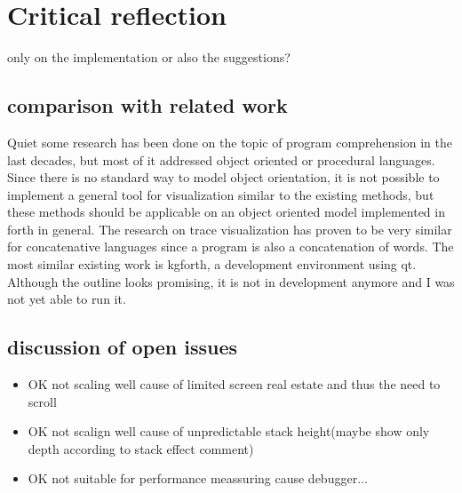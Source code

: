 \chapter{Critical reflection}

only on the implementation or also the suggestions?

\section{comparison with related work}

Quiet some research has been done on the topic of program comprehension in the last decades, but most of it addressed object oriented or procedural languages. Since there is no standard way to model object orientation, it is not possible to implement a general tool for visualization similar to the existing methods, but these methods should be applicable on an object oriented model implemented in forth in general. The research on trace visualization has proven to be very similar for concatenative languages since a program is also a concatenation of words. 
The most similar existing work is kgforth, a development environment using qt. Although the outline looks promising, it is not in development anymore and I was not yet able to run it.

\section{discussion of open issues}

\begin{itemize}
\item OK not scaling well cause of limited screen real estate and thus the need to scroll
\item OK not scalign well cause of unpredictable stack height(maybe show only depth according to stack effect comment)
\item OK not suitable for performance meassuring cause debugger...
\end{itemize}

